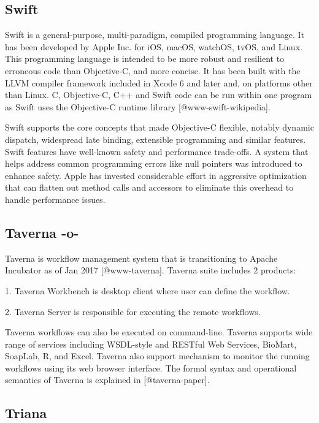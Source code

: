 \subsection{Swift}

Swift is a general-purpose, multi-paradigm, compiled programming
language. It has been developed by Apple Inc. for iOS, macOS, watchOS,
tvOS, and Linux. This programming language is intended to be more
robust and resilient to erroneous code than Objective-C, and more
concise. It has been built with the LLVM compiler framework included
in Xcode 6 and later and, on platforms other than Linux. C,
Objective-C, C++ and Swift code can be run within one program as Swift
uses the Objective-C runtime library [@www-swift-wikipedia].

Swift supports the core concepts that made Objective-C flexible,
notably dynamic dispatch, widespread late binding, extensible
programming and similar features. Swift features have well-known
safety and performance trade-offs. A system that helps address common
programming errors like null pointers was introduced to enhance
safety. Apple has invested considerable effort in aggressive
optimization that can flatten out method calls and accessors to
eliminate this overhead to handle performance issues.
      
\subsection{Taverna -o-}

Taverna is workflow management system that is transitioning to Apache
Incubator as of Jan 2017 [@www-taverna]. Taverna suite includes 2
products:

1. Taverna Workbench is desktop client where user can define the
workflow.

2. Taverna Server is responsible for executing the remote workflows.


Taverna workflows can also be executed on command-line.  Taverna
supports wide range of services including WSDL-style and RESTful
Web Services, BioMart, SoapLab, R, and Excel. Taverna also
support mechanism to monitor the running workflows using its web
browser interface. The formal syntax and operational semantics
of Taverna is explained in [@taverna-paper].



\subsection{Triana}

